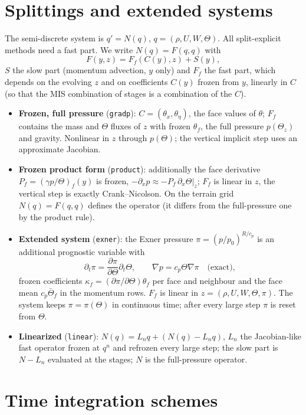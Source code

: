 \documentclass[11pt,a4paper]{article}
\newcommand{\code}[1]{\texttt{\small #1}}
\begin{document}
\section{Splittings and extended systems}
The semi-discrete system is $q'=N(q)$, $q=(\rho,U,W,\Theta)$. All split-explicit methods need a fast
part. We write $N(q)=F(q,q)$ with
\[
F(y,z)=F_f(C(y),z)+S(y),
\]
$S$ the slow part (momentum advection, $y$ only) and $F_f$ the fast part, which depends on the
evolving $z$ and on coefficients $C(y)$ frozen from $y$, linearly in $C$ (so that the MIS combination
of stages is a combination of the $C$).
\begin{itemize}
\item \textbf{Frozen, full pressure} (\code{gradp}): $C=(\theta_x,\theta_\eta)$, the face values of
$\theta$; $F_f$ contains the mass and $\Theta$ fluxes of $z$ with frozen $\theta_f$, the full
pressure $p(\Theta_z)$ and gravity. Nonlinear in $z$ through $p(\Theta)$; the vertical implicit step
uses an approximate Jacobian.
\item \textbf{Frozen product form} (\code{product}): additionally the face derivative
$P_f=(\gamma p/\Theta)_f(y)$ is frozen, $-\partial_xp\approx-P_f\,\partial_x\Theta|_z$; $F_f$ is linear in
$z$, the vertical step is exactly Crank--Nicolson. On the terrain grid $N(q)=F(q,q)$ defines the
operator (it differs from the full-pressure one by the product rule).
\item \textbf{Extended system} (\code{exner}): the Exner pressure $\pi=(p/p_0)^{R/c_p}$ is an additional
prognostic variable with
\[
\partial_t\pi=\frac{\partial\pi}{\partial\Theta}\partial_t\Theta,\qquad
\nabla p=c_p\Theta\nabla\pi\quad\text{(exact)},
\]
frozen coefficients $\kappa_f=(\partial\pi/\partial\Theta)\theta_f$ per face and neighbour and the face
mean $c_p\bar\Theta_f$ in the momentum rows. $F_f$ is linear in $z=(\rho,U,W,\Theta,\pi)$. The system
keeps $\pi=\pi(\Theta)$ in continuous time; after every large step $\pi$ is reset from $\Theta$.
\item \textbf{Linearized} (\code{linear}): $N(q)=L_nq+(N(q)-L_nq)$, $L_n$ the Jacobian-like fast
operator frozen at $q^n$ and refrozen every large step; the slow part is $N-L_n$ evaluated at the
stages; $N$ is the full-pressure operator.
\end{itemize}

\section{Time integration schemes}
\end{document}
